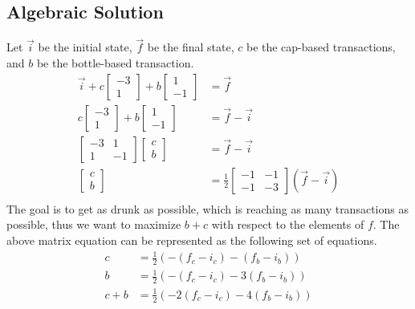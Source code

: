\documentclass[letterpaper, 12pt]{article}
\begin{document}
\subsection{Algebraic Solution}
Let $\vec{i}$ be the initial state, $\vec{f}$ be the final state, $c$ be the cap-based transactions, and $b$ be the bottle-based transaction.
\begin{align*}
    \vec{i}
    + c
    \begin{bmatrix}
        -3\\
        1
    \end{bmatrix}
    + b
    \begin{bmatrix}
        1\\
        -1
    \end{bmatrix}
    &=
    \vec{f}\\
    c
    \begin{bmatrix}
        -3\\
        1
    \end{bmatrix}
    + b
    \begin{bmatrix}
        1\\
        -1
    \end{bmatrix}
    &=
    \vec{f} - \vec{i}\\
    \begin{bmatrix}
        -3 & 1\\
         1 &-1
    \end{bmatrix}
    \begin{bmatrix}
        c\\
        b
    \end{bmatrix}
    &=
    \vec{f} - \vec{i}\\
    \begin{bmatrix}
        c\\
        b
    \end{bmatrix}
    &=
    \frac{1}{2}
    \begin{bmatrix}
        -1 &-1\\
        -1 &-3
    \end{bmatrix}
    (\vec{f} - \vec{i})\\
\end{align*}
The goal is to get as drunk as possible, which is reaching as many transactions as possible, thus we want to maximize $b + c$ with respect to the elements of $f$.
The above matrix equation can be represented as the following set of equations.
\begin{align*}
    c &= \frac{1}{2}(-(f_c - i_c) - (f_b - i_b))\\
    b &= \frac{1}{2}(-(f_c - i_c) - 3(f_b - i_b))\\
    c + b &= \frac{1}{2}(-2(f_c - i_c) - 4(f_b - i_b))
\end{align*}
\end{document}
